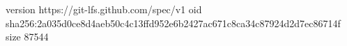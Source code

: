 version https://git-lfs.github.com/spec/v1
oid sha256:2a035d0ce8d4aeb50c4c13ffd952e6b2427ac671c8ca34c87924d2d7ec86714f
size 87544
